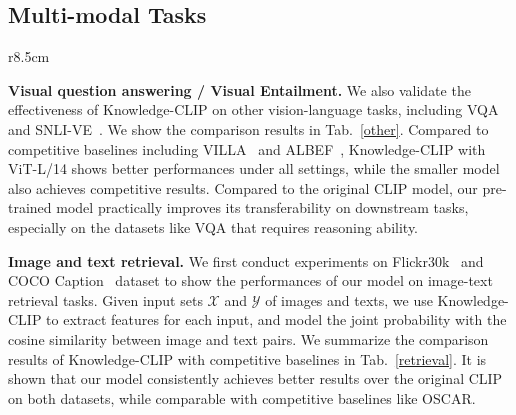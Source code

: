 \subsection{Multi-modal Tasks}
\begin{wraptable}{r}{8.5cm}
\vskip -0.3in
    \centering
    \caption{Fine-tuned results on other V-L tasks.}
    \vskip 0.1in
    \label{other}
\vskip -0.15in
\end{wraptable}

\textbf{Visual question answering / Visual Entailment.} We also validate the effectiveness of Knowledge-CLIP on other vision-language tasks, including VQA~\cite{vqa} and SNLI-VE~\cite{ve}. We show the comparison results in Tab.~\ref{other}. Compared to competitive baselines including VILLA~\cite{villa} and ALBEF~\cite{albef}, Knowledge-CLIP with ViT-L/14 shows better performances under all settings, while the smaller model also achieves competitive results. Compared to the original CLIP model, our pre-trained model practically improves its transferability on downstream tasks, especially on the datasets like VQA that requires reasoning ability.

\textbf{Image and text retrieval.} We first conduct experiments on Flickr30k~\cite{flickr30k} and COCO Caption~\cite{cococap} dataset to show the performances of our model on image-text retrieval tasks. Given input sets $\mathcal{X}$ and $\mathcal{Y}$ of images and texts, we use Knowledge-CLIP to extract features for each input, and model the joint probability with the cosine similarity between image and text pairs. We summarize the comparison results of Knowledge-CLIP with competitive baselines in Tab.~\ref{retrieval}. It is shown that our model consistently achieves better results over the original CLIP on both datasets, while comparable with competitive baselines like OSCAR.

